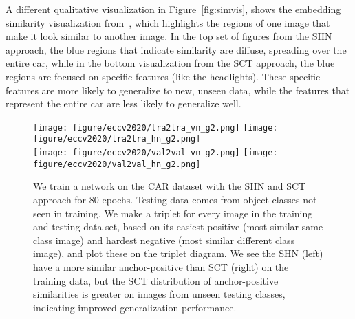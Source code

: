 \documentclass[runningheads]{llncs}
\begin{document}
A different qualitative visualization in Figure~\ref{fig:simvis}, shows the embedding similarity visualization from~\cite{stylianouSimVis2019}, which highlights the regions of one image that make it look similar to another image. In the top set of figures from the SHN approach, the blue regions that indicate similarity are diffuse, spreading over the entire car, while in the bottom visualization from the SCT approach, the blue regions are focused on specific features (like the headlights). These specific features are more likely to generalize to new, unseen data, while the features that represent the entire car are less likely to generalize well.

\begin{figure}[t]
    \centering
    \texttt{[image: figure/eccv2020/tra2tra\_vn\_g2.png]}
    \texttt{[image: figure/eccv2020/tra2tra\_hn\_g2.png]}\\
    \texttt{[image: figure/eccv2020/val2val\_vn\_g2.png]}
    \texttt{[image: figure/eccv2020/val2val\_hn\_g2.png]}
    \caption{We train a network on the CAR dataset with the SHN and SCT approach for 80 epochs.  Testing data comes from object classes not seen in training.  We make a triplet for every image in the training and testing data set, based on its easiest positive (most similar same class image) and hardest negative (most similar different class image), and plot these on the triplet diagram. We see the SHN (left) have a more similar anchor-positive than SCT (right) on the training data, but the SCT distribution of anchor-positive similarities is greater on images from unseen testing classes, indicating improved generalization performance.}
    \label{fig:tra_test_diagram}
\end{figure}
\end{document}
